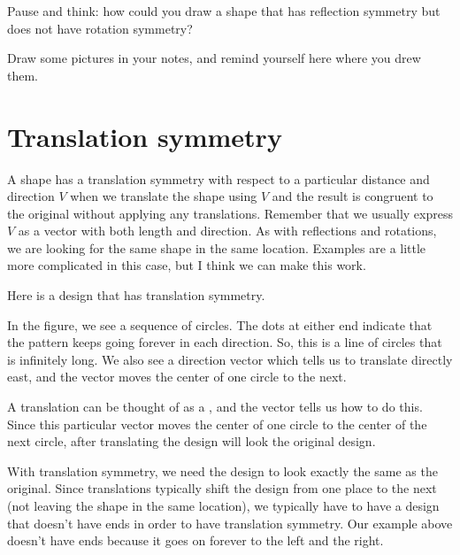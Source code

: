 \documentclass{ximera}
\begin{document}
\begin{question}
Pause and think: how could you draw a shape that has reflection symmetry but does not have rotation symmetry?
\begin{freeResponse}
Draw some pictures in your notes, and remind yourself here where you drew them.
\end{freeResponse}
\end{question}


\section{Translation symmetry}

A shape has a translation symmetry with respect to a particular distance and direction $V$ when we translate the shape using $V$ and the result is congruent to the original without applying any translations. Remember that we usually express $V$ as a vector with both length and direction. As with reflections and rotations, we are looking for the same shape in the same location. Examples are a little more complicated in this case, but I think we can make this work.

\begin{example}
Here is a design that has translation symmetry.
\begin{image}
\end{image}
In the figure, we see a sequence of circles. The dots at either end indicate that the pattern keeps going forever in each direction. So, this is a line of circles that is infinitely long. We also see a direction vector which tells us to translate directly east, and the vector moves the center of one circle to the next.

A translation can be thought of as a  , and the vector tells us how to do this. Since this particular vector moves the center of one circle to the center of the next circle, after translating the design will look  the original design.

\end{example}
With translation symmetry, we need the design to look exactly the same as the original. Since translations typically shift the design from one place to the next (not leaving the shape in the same location), we typically have to have a design that doesn't have ends in order to have translation symmetry. Our example above doesn't have ends because it goes on forever to the left and the right.
\end{document}
